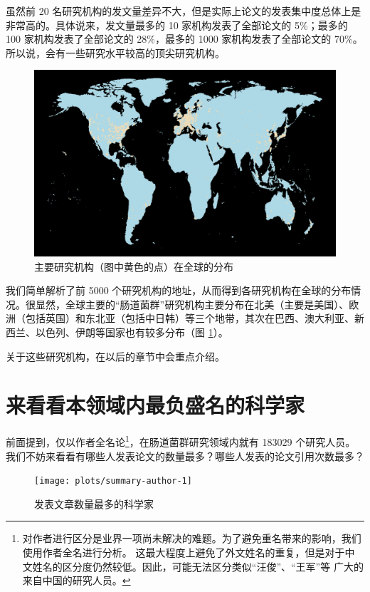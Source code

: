 \documentclass[]{ctexbook}
\begin{document}
虽然前 20 名研究机构的发文量差异不大，但是实际上论文的发表集中度总体上是非常高的。具体说来，发文量最多的 10 家机构发表了全部论文的 5\%；最多的 100 家机构发表了全部论文的 28\%，最多的 1000 家机构发表了全部论文的 70\%。所以说，会有一些研究水平较高的顶尖研究机构。

\begin{figure}
\includegraphics[width=1\linewidth]{plots/affiliation-location-1} \caption{主要研究机构（图中黄色的点）在全球的分布}\label{fig:affiliation-location}
\end{figure}

我们简单解析了前 5000 个研究机构的地址，从而得到各研究机构在全球的分布情况。很显然，全球主要的``肠道菌群''研究机构主要分布在北美（主要是美国）、欧洲（包括英国）和东北亚（包括中日韩）等三个地带，其次在巴西、澳大利亚、新西兰、以色列、伊朗等国家也有较多分布（图 \ref{fig:affiliation-location}）。

关于这些研究机构，在以后的章节中会重点介绍。

\hypertarget{top-scientist}{%
\section{来看看本领域内最负盛名的科学家}\label{top-scientist}}

前面提到，仅以作者全名论\footnote{对作者进行区分是业界一项尚未解决的难题。为了避免重名带来的影响，我们使用作者全名进行分析。
  这最大程度上避免了外文姓名的重复，但是对于中文姓名的区分度仍然较低。因此，可能无法区分类似``汪俊''、``王军''等
  广大的来自中国的研究人员。}，在肠道菌群研究领域内就有 183029 个研究人员。我们不妨来看看有哪些人发表论文的数量最多？哪些人发表的论文引用次数最多？

\begin{figure}
\texttt{[image: plots/summary-author-1]} \caption{发表文章数量最多的科学家}\label{fig:summary-author}
\end{figure}
\end{document}
